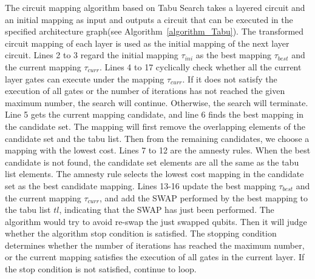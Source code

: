 \documentclass[runningheads]{llncs}
\begin{document}
	The circuit mapping algorithm based on Tabu Search takes a layered circuit and an initial mapping as input and outputs a circuit that can be executed in the specified architecture graph(see Algorithm~\ref{algorithm_Tabu}). The transformed circuit mapping of each layer is used as the initial mapping of the next layer circuit. Lines 2 to 3 regard the initial mapping $\tau_{ini}$ as the best mapping $\tau_{best}$ and the current mapping $\tau_{curr}$. Lines 4 to 17 cyclically check whether all the current layer gates can execute under the mapping $\tau_{curr}$. If it does not satisfy the execution of all gates or the number of iterations has not reached the given maximum number, the search will continue. Otherwise, the search will terminate. Line 5  gets the current mapping candidate, and line 6 finds the best mapping in the candidate set. The mapping will first remove the overlapping elements of the candidate set and the tabu list. Then from the remaining candidates, we choose a mapping with the lowest cost. Lines 7 to 12 are the amnesty rules. When the best candidate is not found, the candidate set elements are all the same as the tabu list elements. The amnesty rule selects the lowest cost mapping in the candidate set as the best candidate mapping. Lines 13-16 update the best mapping $\tau_{best}$ and the current mapping $\tau_{curr}$, and add the SWAP performed by the best mapping to the tabu list $tl$, indicating that the SWAP has just been performed. The algorithm would try to avoid re-swap the just swapped qubits. Then it will judge whether the algorithm stop condition is satisfied. The stopping condition determines whether the number of iterations has reached the maximum number, or the current mapping satisfies the execution of all gates in the current layer. If the stop condition is not satisfied, continue to loop.
\end{document}
